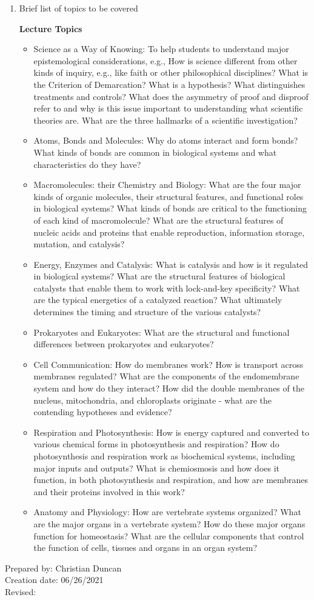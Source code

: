 \begin{enumerate}[1.]
\item Brief list of topics to be covered\\
  {\bfseries
    Lecture Topics
    \begin{itemize}
      \item Science as a Way of Knowing: To help students to understand major epistemological considerations, e.g., How is science different from other kinds of inquiry, e.g., like faith or other philosophical disciplines? What is the Criterion of Demarcation? What is a hypothesis? What distinguishes treatments and controls? What does the asymmetry of proof and disproof refer to and why is this issue important to understanding what scientific theories are. What are the three hallmarks of a scientific investigation?
      \item Atoms, Bonds and Molecules: Why do atoms interact and form bonds? What kinds of bonds are common in biological systems and what characteristics do they have?
      \item Macromolecules: their Chemistry and Biology: What are the four major kinds of organic molecules, their structural features, and functional roles in biological systems? What kinds of bonds are critical to the functioning of each kind of macromolecule? What are the structural features of nucleic acids and proteins that enable reproduction, information storage, mutation, and catalysis?
      \item Energy, Enzymes and Catalysis: What is catalysis and how is it regulated in biological systems? What are the structural features of biological catalysts that enable them to work with lock-and-key specificity? What are the typical energetics of a catalyzed reaction? What ultimately determines the timing and structure of the various catalysts?
      \item Prokaryotes and Eukaryotes: What are the structural and functional differences between prokaryotes and eukaryotes?
      \item Cell Communication: How do membranes work? How is transport across membranes regulated? What are the components of the endomembrane system and how do they interact? How did the double membranes of the nucleus, mitochondria, and chloroplasts originate - what are the contending hypotheses and evidence?
      \item Respiration and Photosynthesis: How is energy captured and converted to various chemical forms in photosynthesis and respiration? How do photosynthesis and respiration work as biochemical systems, including major inputs and outputs? What is chemiosmosis and how does it function, in both photosynthesis and respiration, and how are membranes and their proteins involved in this work?
      \item Anatomy and Physiology: How are vertebrate systems organized?  What are the major organs in a vertebrate system?  How do these major organs function for homeostasis?  What are the cellular components that control the function of cells, tissues and organs in an organ system?
    \end{itemize}
  }

\end{enumerate}

\noindent Prepared by: Christian Duncan\\
\noindent Creation date: 06/26/2021\\
\noindent Revised:\\
